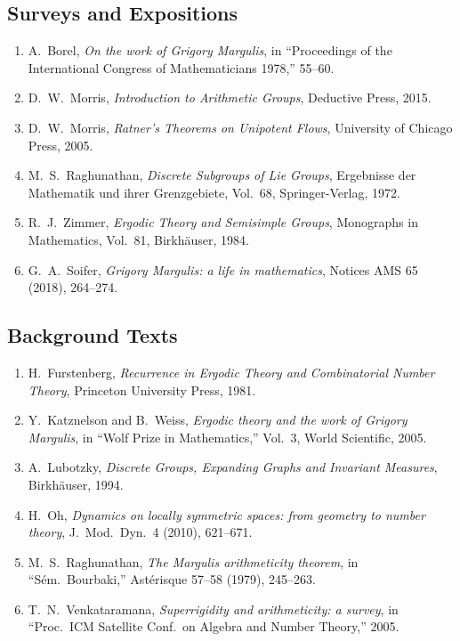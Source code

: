 \subsection*{Surveys and Expositions}
\begin{enumerate}
    \item A.\ Borel, \textit{On the work of Grigory Margulis}, in ``Proceedings of the International Congress of Mathematicians 1978,'' 55--60.
    \item D.\ W.\ Morris, \textit{Introduction to Arithmetic Groups}, Deductive Press, 2015.
    \item D.\ W.\ Morris, \textit{Ratner's Theorems on Unipotent Flows}, University of Chicago Press, 2005.
    \item M.\ S.\ Raghunathan, \textit{Discrete Subgroups of Lie Groups}, Ergebnisse der Mathematik und ihrer Grenzgebiete, Vol.\ 68, Springer-Verlag, 1972.
    \item R.\ J.\ Zimmer, \textit{Ergodic Theory and Semisimple Groups}, Monographs in Mathematics, Vol.\ 81, Birkh\"auser, 1984.
    \item G.\ A.\ Soifer, \textit{Grigory Margulis: a life in mathematics}, Notices AMS 65 (2018), 264--274.
\end{enumerate}

\subsection*{Background Texts}
\begin{enumerate}
    \item H.\ Furstenberg, \textit{Recurrence in Ergodic Theory and Combinatorial Number Theory}, Princeton University Press, 1981.
    \item Y.\ Katznelson and B.\ Weiss, \textit{Ergodic theory and the work of Grigory Margulis}, in ``Wolf Prize in Mathematics,'' Vol.\ 3, World Scientific, 2005.
    \item A.\ Lubotzky, \textit{Discrete Groups, Expanding Graphs and Invariant Measures}, Birkh\"auser, 1994.
    \item H.\ Oh, \textit{Dynamics on locally symmetric spaces: from geometry to number theory}, J.\ Mod.\ Dyn.\ 4 (2010), 621--671.
    \item M.\ S.\ Raghunathan, \textit{The Margulis arithmeticity theorem}, in ``S\'em.\ Bourbaki,'' Ast\'erisque 57--58 (1979), 245--263.
    \item T.\ N.\ Venkataramana, \textit{Superrigidity and arithmeticity: a survey}, in ``Proc.\ ICM Satellite Conf.\ on Algebra and Number Theory,'' 2005.
\end{enumerate}

